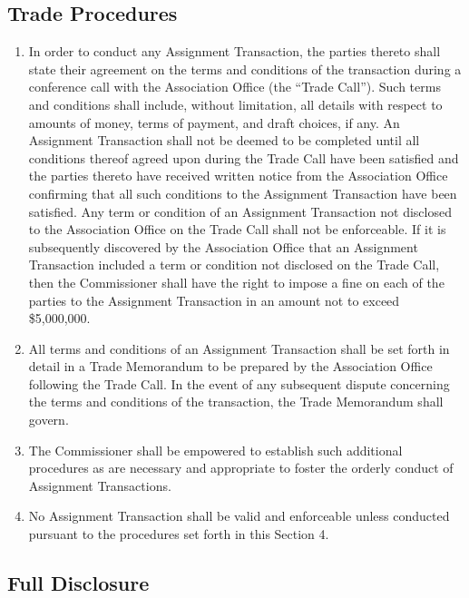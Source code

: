 \documentclass[]{book}
\providecommand{\tightlist}{%
  \setlength{\itemsep}{0pt}\setlength{\parskip}{0pt}}
\begin{document}
\hypertarget{trade-procedures}{%
\subsection{Trade Procedures}\label{trade-procedures}}

\begin{enumerate}
\def\labelenumi{(\alph{enumi})}
\tightlist
\item
  In order to conduct any Assignment Transaction, the parties thereto shall state their agreement on the terms and conditions of the transaction during a conference call with the Association Office (the ``Trade Call''). Such terms and conditions shall include, without limitation, all details with respect to amounts of money, terms of payment, and draft choices, if any. An Assignment Transaction shall not be deemed to be completed until all conditions thereof agreed upon during the Trade Call have been satisfied and the parties thereto have received written notice from the Association Office confirming that all such conditions to the Assignment Transaction have been satisfied. Any term or condition of an Assignment Transaction not disclosed to the Association Office on the Trade Call shall not be enforceable. If it is subsequently discovered by the Association Office that an Assignment Transaction included a term or condition not disclosed on the Trade Call, then the Commissioner shall have the right to impose a fine on each of the parties to the Assignment Transaction in an amount not to exceed \$5,000,000.
\item
  All terms and conditions of an Assignment Transaction shall be set forth in detail in a Trade Memorandum to be prepared by the Association Office following the Trade Call. In the event of any subsequent dispute concerning the terms and conditions of the transaction, the Trade Memorandum shall govern.
\item
  The Commissioner shall be empowered to establish such additional procedures as are necessary and appropriate to foster the orderly conduct of Assignment Transactions.
\item
  No Assignment Transaction shall be valid and enforceable unless conducted pursuant to the procedures set forth in this Section 4.
\end{enumerate}

\hypertarget{full-disclosure}{%
\subsection{Full Disclosure}\label{full-disclosure}}
\end{document}
